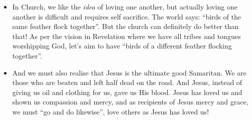 \begin{itemize}
{  opportunity, let us do good to everyone, and especially to those who are of
  the household of faith''. }
  \item{In Church, we like the \textit{idea} of loving one another, but
  actually loving one another is difficult and requires self sacrifice. The
  world says: ``birds of the same feather flock together''. But the church
  can definitely do better than that! As per the vision in Revelation where
  we have all tribes and tongues worshipping God, let's aim to have ``birds
  of a different feather flocking together''.}
  \item{And we must also realise that Jesus is the ultimate good Samaritan.
  We are those who are beaten and left half dead on the road. And Jesus,
  instead of giving us oil and clothing for us, gave us His blood. Jesus has loved us and shown us compassion and mercy, and as recipients of Jesus mercy and grace, we must ``go and do likewise'', love others as Jesus has loved us!}
\end{itemize}